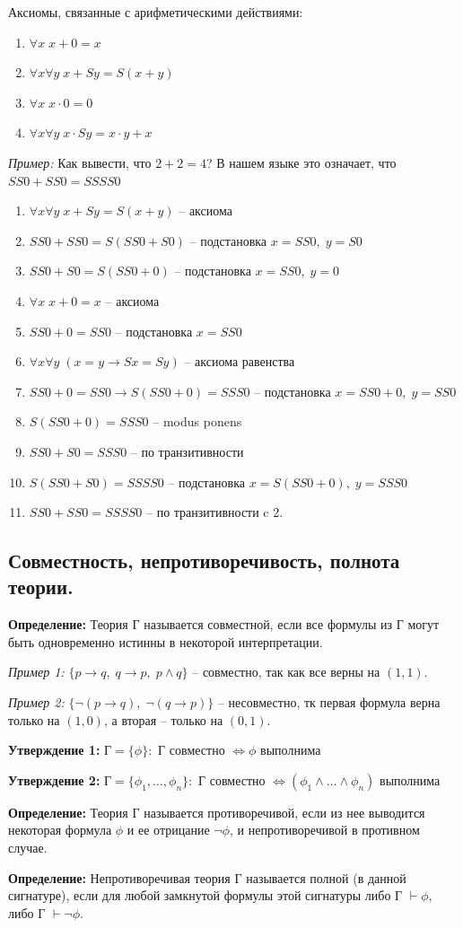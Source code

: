 Аксиомы, связанные с арифметическими действиями:
\begin{enumerate}
    \item $\forall x \; x+0=x$
    \item $\forall x \forall y \; x+Sy=S(x+y)$
    \item $\forall x \; x\cdot 0 = 0$
    \item $\forall x \forall y \; x\cdot Sy = x\cdot y + x$
\end{enumerate}

\textit{Пример:} Как вывести, что $2+2 = 4$? В нашем языке это означает, что $SS0+SS0=SSSS0$
\begin{enumerate}
    \item $\forall x \forall y \; x+Sy = S(x+y)$ -- аксиома
    \item $SS0+SS0 = S(SS0+S0)$ -- подстановка $x=SS0, \; y=S0$
    \item $SS0+S0 = S(SS0+0)$ -- подстановка $x=SS0, \; y=0$
    \item $\forall x \; x+0 = x$ -- аксиома
    \item $SS0 + 0 = SS0$ -- подстановка $x=SS0$
    \item $\forall x \forall y \; (x=y \to Sx = Sy)$ -- аксиома равенства
    \item $SS0+0 = SS0\to S(SS0 + 0)=SSS0$ -- подстановка $x=SS0+0,\; y=SS0$
    \item $S(SS0+0)=SSS0$ -- modus ponens
    \item $SS0 + S0 = SSS0$ -- по транзитивности
    \item $S(SS0+S0)=SSSS0$ -- подстановка $x=S(SS0+0), \; y=SSS0$
    \item $SS0 + SS0 = SSSS0$ -- по транзитивности c 2.
\end{enumerate}

\subsection{Совместность, непротиворечивость, полнота теории.}

\textbf{Определение:} Теория Г называется совместной, если все формулы из Г могут быть одновременно истинны в некоторой интерпретации.

\textit{Пример 1:} $\{p \to q,\; q\to p,\; p\land q\}$ -- совместно, так как все верны на $(1,1)$.

\textit{Пример 2:} $\{ \neg (p \to q),\; \neg (q\to p)\}$ -- несовместно, тк первая формула верна только на $(1,0)$, а вторая -- только на $(0,1)$.

\textbf{Утверждение 1:} Г$=\{\phi\}:$ Г совместно $\Leftrightarrow \phi$ выполнима

\textbf{Утверждение 2:} Г$=\{\phi_1,\ldots,\phi_n\}:$ Г совместно $\Leftrightarrow (\phi_1\land\ldots\land\phi_n)$ выполнима
\newline \par \textbf{Определение:} Теория Г называется противоречивой, если из нее выводится некоторая формула $\phi$ и ее отрицание $\neg\phi$, и непротиворечивой в противном случае.

\textbf{Определение:} Непротиворечивая теория Г называется полной (в данной сигнатуре), если для любой замкнутой формулы  этой сигнатуры либо Г $\vdash\phi$, либо Г $\vdash\neg\phi$.